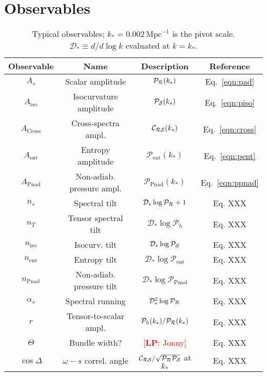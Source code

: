\documentclass[11pt]{article}
\def\calR{{\cal R}}
\def\calS{{\cal S}}
\def\Pten{{\mathcal P_h}}
\def\Pent{{\mathcal P_\mathrm{ent}}}
\def\Ppnad{{\mathcal P_\mathrm{Pnad}}}
\def\Cross{{\mathcal C_\mathrm{\calR \calS}}}
\def\PR{{\mathcal P_\calR}}
\def\PS{{\mathcal P_\calS}}
\newcommand{\lp}[1]{\textcolor{red}{[{\bf LP}: #1]}}
\begin{document}
\section{Observables}

\begin{table}
  \centering
  \begin{tabular}{  c  c c  c }
    \hline
    Observable &  Name & Description & Reference \\
    \hline
    $A_s$ \dotfill             &   Scalar amplitude & $\PR(k_*)$  & Eq.~\eqref{eqn:pad}  \\
    $A_\mathrm{iso}$  \dotfill &   Isocurvature amplitude & $\PS(k_*)$ & Eq.~\eqref{eqn:piso}  \\
   $A_\mathrm{Cross}$ \dotfill &   Cross-spectra ampl.& $\Cross(k_*)$ & Eq.~\eqref{eqn:cross}  \\
    $A_\mathrm{ent}$  \dotfill &   Entropy amplitude& $\Pent(k_*)$ & Eq.~\eqref{eqn:pent}  \\
    $A_\mathrm{Pnad}$ \dotfill &   Non-adiab. pressure ampl.& $\Ppnad(k_*)$ & Eq.~\eqref{eqn:ppnad}  \\
    \hline

    $n_s$  \dotfill            &    Spectral tilt & $\mathcal D_* \log \PR+1$& Eq. XXX  \\
    $n_T$  \dotfill            &    Tensor spectral tilt & $\mathcal D_* \log \Pten$& Eq. XXX  \\
    $n_\mathrm{iso}$  \dotfill &    Isocurv. tilt & $\mathcal D_* \log \PS$& Eq. XXX  \\
    $n_\mathrm{ent}$  \dotfill &    Entropy tilt & $\mathcal D_* \log \Pent$& Eq. XXX \\
    $n_\mathrm{Pnad}$ \dotfill &    Non-adiab. pressure tilt & $\mathcal D_* \log \Ppnad$& Eq. XXX  \\
    \hline

    $\alpha_s$  \dotfill     &  Spectral running & $\mathcal D_*^2 \log \PR$ & Eq. XXX  \\
    $r$    \dotfill          &  Tensor-to-scalar ampl. & $\Pten(k_*)/\PR(k_*)$ & Eq. XXX  \\
    $\Theta$ \dotfill            &  Bundle width?  & \lp{Jonny}  & Eq. XXX  \\
    $\cos \Delta$ \dotfill            &  $\omega-s$ correl. angle & $\Cross/\sqrt{\mathcal P_{\mathcal R} \mathcal P_{\mathcal S}}$ at $k_*$   & Eq. XXX  \\
    \hline
  \end{tabular}

  \caption{Typical observables; $k_*=0.002 \, \mathrm{Mpc}^{-1}$ is the pivot scale.    $\mathcal D_* \equiv d/d \log k$ evaluated at $k=k_*$.}
  \label{table:observables}
\end{table}
\end{document}
